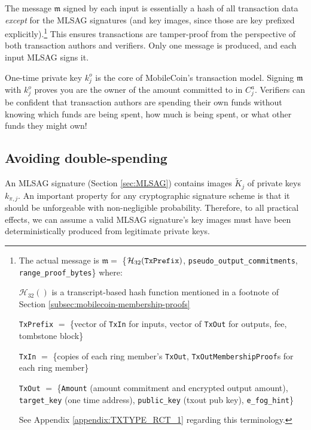 The message $\mathfrak{m}$ signed by each input is essentially a hash of all transaction data {\em except} for the MLSAG signatures (and key images, since those are key prefixed explicitly).\footnote{The actual message is $\mathfrak{m} =$ \{$\mathcal{H}_{32}(\textrm{\tt TxPrefix})$, {\tt pseudo\_output\_commitments}, {\tt range\_proof\_bytes}\} where:\par
$\mathcal{H}_{32}()$ is a transcript-based hash function mentioned in a footnote of Section \ref{subsec:mobilecoin-membership-proofs}\par
{\tt TxPrefix} $=$ \{vector of {\tt TxIn} for inputs, vector of {\tt TxOut} for outputs, fee, tombstone block\}\par
{\tt TxIn} $=$ \{copies of each ring member's {\tt TxOut}, {\tt TxOutMembershipProof}s for each ring member\}\par
{\tt TxOut} $=$ \{{\tt Amount} (amount commitment and encrypted output amount), {\tt target\_key} (one time address), {\tt public\_key} (txout pub key), {\tt e\_fog\_hint}\}\par
See Appendix \ref{appendix:TXTYPE_RCT_1} regarding this terminology.} This ensures transactions are tamper-proof from the perspective of both transaction authors and verifiers. Only one message is produced, and each input MLSAG signs it.%

One-time private key $k^o_j$ is the core of MobileCoin's transaction model. Signing $\mathfrak{m}$ with $k^o_j$ proves you are the owner of the amount committed to in $C^a_j$. Verifiers can be confident that transaction authors are spending their own funds without knowing which funds are being spent, how much is being spent, or what other funds they might own!


\subsection{Avoiding double-spending}
\label{subsec:ringct-double-spend}

An MLSAG signature (Section \ref{sec:MLSAG}) contains images \(\tilde{K}_{j}\) of private keys \(k_{\pi, j}\). An important property for any cryptographic signature scheme is that it should be unforgeable with non-negligible probability. Therefore, to all practical effects, we can assume a valid MLSAG signature’s key images must have been deterministically produced from legitimate private keys.\\

